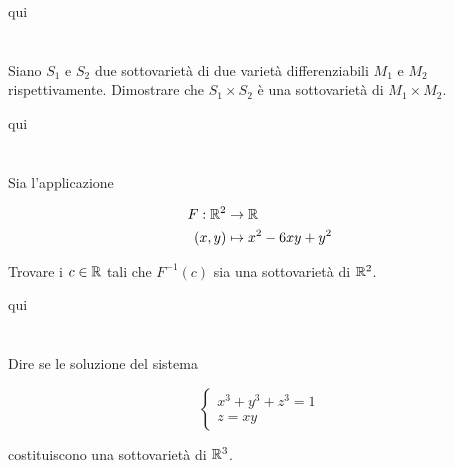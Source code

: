 qui




\tocless\section{}\label{es2-12}

\begin{tcolorbox}
	Siano $ S_{1} $ e $ S_{2} $ due sottovarietà di due varietà differenziabili $ M_{1} $ e $ M_{2} $ rispettivamente. Dimostrare che $ S_{1} \times S_{2} $ è una sottovarietà di $ M_{1} \times M_{2} $.
\end{tcolorbox}

qui

\tocless\section{}\label{es2-13}

\begin{tcolorbox}
	Sia l'applicazione
	
	\begin{align}
		\begin{split}
			F : \mathbb{R}^{2} &\to \mathbb{R}\\
			(x,y) &\mapsto x^{2}-6xy+y^{2}
		\end{split}
	\end{align}

	Trovare i $ c \in \mathbb{R} $ tali che $ F^{-1}(c) $ sia una sottovarietà di $ \mathbb{R}^{2} $.
\end{tcolorbox}

qui

\tocless\section{}\label{es2-14}

\begin{tcolorbox}
	Dire se le soluzione del sistema
	
	\begin{equation}
		\begin{cases}
			x^{3} + y^{3} + z^{3} = 1\\
			z = xy
		\end{cases}
	\end{equation}

	costituiscono una sottovarietà di $ \mathbb{R}^{3} $.
\end{tcolorbox}

